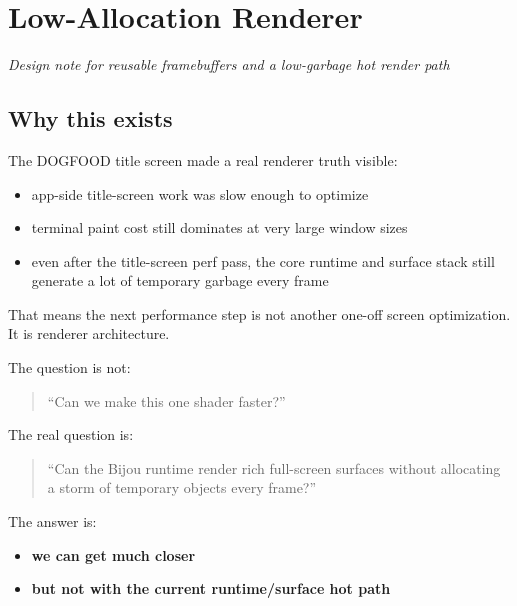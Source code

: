 \chapter{Low-Allocation Renderer}\label{record-052}

\smallskip

\emph{Design note for reusable framebuffers and a low-garbage hot render path}

\section{Why this exists}\label{record-052-why-this-exists}

The DOGFOOD title screen made a real renderer truth visible:

\begin{itemize}
\tightlist
\item
  app-side title-screen work was slow enough to optimize
\item
  terminal paint cost still dominates at very large window sizes
\item
  even after the title-screen perf pass, the core runtime and surface stack still generate a lot of temporary garbage every frame
\end{itemize}

That means the next performance step is not another one-off screen optimization. It is renderer architecture.

The question is not:

\begin{quote}
``Can we make this one shader faster?''
\end{quote}

The real question is:

\begin{quote}
``Can the Bijou runtime render rich full-screen surfaces without allocating a storm of temporary objects every frame?''
\end{quote}

The answer is:

\begin{itemize}
\tightlist
\item
  \textbf{we can get much closer}
\item
  \textbf{but not with the current runtime/surface hot path}
\end{itemize}

